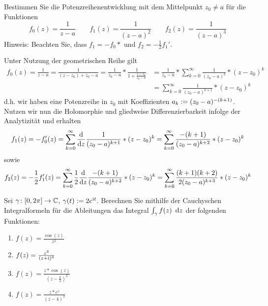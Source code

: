 \begin{exercisePage}
	
	\begin{task}
		Bestimmen Sie die Potenzreihenentwicklung mit dem Mittelpunkt $z_0 \neq a$ für die Funktionen
		\begin{equation*}
			f_0(z) = \frac{1}{z-a} \qquad f_1(z) = \frac{1}{(z-a)^2} \qquad f_2(z) = \frac{1}{(z-a)^3}
		\end{equation*}
		Hinweis: Beachten Sie, dass $f_1 = -f_0*$ und $f_2 = -\frac{1}{2} f_1'$.
	\end{task}

	Unter Nutzung der geometrischen Reihe gilt
	\begin{equation*}
		\begin{aligned}
			f_0(z) = \frac{1}{z-a} = \frac{1}{(z-z_0) + z_0 - a} = \frac{1}{z_0 - a} * \frac{1}{1 + \frac{z-z_0}{z_0 - a}} 
			&= \frac{1}{z_0 - a} * \sum_{k=0}^\infty \frac{1}{(z_0 - a)^k} * (z-z_0)^k \\
			&=\sum_{k=0}^\infty \frac{1}{(z_0 - a)^{k+1}} * (z-z_0)^k
		\end{aligned}
	\end{equation*}
	d.h. wir haben eine Potenzreihe in $z_0$ mit Koeffizienten $a_k \mathrel{:=} (z_0 - a)^{-(k+1)}$.
	Nutzen wir nun die Holomorphie und gliedweise Differenzierbarkeit infolge der Analytizität und erhalten
	\begin{equation*}
		f_1(z) = - f_0'(z) 
		= \sum_{k=0}^\infty \frac{\mathrm{d}}{\mathrm{d} z } \frac{1}{(z_0 - a)^{k+1}} * (z-z_0)^k 
		= \sum_{k=0}^\infty \frac{-(k+1)}{(z_0 - a)^{k+2}} * (z-z_0)^k
	\end{equation*}
	sowie
	\begin{equation*}
		f_2(z) = - \frac{1}{2} f_1'(z)
		= \sum_{k=0}^\infty \frac{1}{2} \frac{\mathrm{d}}{\mathrm{d} z } \frac{-(k+1)}{(z_0 - a)^{k+2}} * (z-z_0)^k
		= \sum_{k=0}^\infty \frac{(k+1)(k+2)}{2 (z_0 - a)^{k+3}} * (z-z_0)^k
	\end{equation*}
	
	\begin{task}
		Sei $\gamma \colon [0, 2\pi] \to \mathbb{C}$, $\gamma(t) \mathrel{:=} 2 e^{\mathrm{i} t}$. Berechnen Sie mithilfe der Cauchyschen Integralformeln für die Ableitungen das Integral $\int_\gamma f(z) \enskip \mathrm{d}z$ der folgenden Funktionen:
		\begin{enumerate}
			\item $f(z) = \frac{\cos(z)}{z^2}$
			\item $f(z) = \frac{z^3}{(z+\mathrm{i})^3}$
			\item $f(z) = \frac{z * \cos(z)}{(z - \frac{\pi}{2})^2}$
			\item $f(z) = \frac{z * e^z}{(z-4)^3}$
		\end{enumerate} 
	\end{task}


\end{exercisePage}
